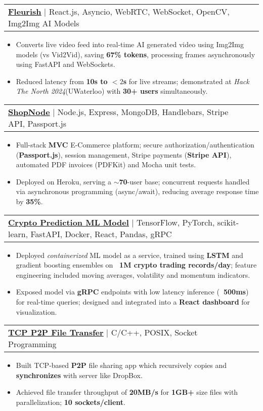 \documentclass[letterpaper,11pt]{article}
\makeatletter
\newcommand{\resumeItem}[1]{\item\small{{#1 \vspace{-2pt}}}}
\newcommand{\resumeProjectHeading}[2]{\item
    \begin{tabular*}{0.97\textwidth}{l@{\extracolsep{\fill}}r}
      \small#1 & #2 \\
    \end{tabular*}\vspace{-4pt}}
\newcommand{\resumeItemListStart}{\begin{itemize}[label=\textbullet]}
\newcommand{\resumeItemListEnd}{\end{itemize}\vspace{-5pt}}
\makeatother
\begin{document}
\resumeProjectHeading
{\href{https://github.com/knightwayne/HackTheNorth-2024}{\underline{\textbf{Fleurish}}} | React.js, Asyncio, WebRTC, WebSocket, OpenCV, Img2Img AI Models}{}
\resumeItemListStart
\resumeItem{Converts live video feed into real-time AI generated video using Img2Img models (vs Vid2Vid), saving \textbf{67\% tokens}, processing frames asynchronously using FastAPI and WebSockets.}
\resumeItem{Reduced latency from \textbf{10s to $<2$s} for live streams; demonstrated at \textit{Hack The North 2024}(UWaterloo) with \textbf{30+ users} simultaneously.}
\resumeItemListEnd

\resumeProjectHeading
{\href{https://github.com/knightwayne/Ecommerce-Website}{\underline{\textbf{ShopNode}}} | Node.js, Express, MongoDB, Handlebars, Stripe API, Passport.js}{}
\resumeItemListStart
\resumeItem{Full-stack \textbf{MVC} E-Commerce platform; secure authorization/authentication (\textbf{Passport.js}), session management, Stripe payments (\textbf{Stripe API}), automated PDF invoices (PDFKit) and Mocha unit tests.}
\resumeItem{Deployed on Heroku, serving a \textbf{$\sim$70}-user base; concurrent requests handled via asynchronous programming (async/await), reducing average response time by \textbf{35\%}.}
\resumeItemListEnd

\resumeProjectHeading
{\href{https://github.com/knightwayne/}{\underline{\textbf{Crypto Prediction ML Model}}} |  TensorFlow, PyTorch, scikit-learn, FastAPI, Docker, React, Pandas, gRPC}{}
\resumeItemListStart
\resumeItem{Deployed \textit{containerized} ML model as a service, trained using \textbf{LSTM} and gradient boosting ensembles on \textbf{~1M crypto trading records/day}; feature engineering included moving averages, volatility and momentum indicators.}
\resumeItem{Exposed model via \textbf{gRPC} endpoints with low latency inference (\textbf{~500ms}) for real-time queries; designed and integrated into a \textbf{React dashboard} for visualization.}
\resumeItemListEnd

\resumeProjectHeading
{\href{https://github.com/knightwayne/Mini-Dropbox-Simulator}{\underline{\textbf{TCP P2P File Transfer}}} | C/C++, POSIX, Socket Programming}{}
\resumeItemListStart
\resumeItem{Built TCP-based \textbf{P2P} file sharing app which recursively copies and \textbf{synchronizes} with server like DropBox.}
\resumeItem{Achieved file transfer throughput of \textbf{20MB/s} for \textbf{1GB+} size files with parallelization; \textbf{10 sockets/client}.}
\resumeItemListEnd
\end{document}
